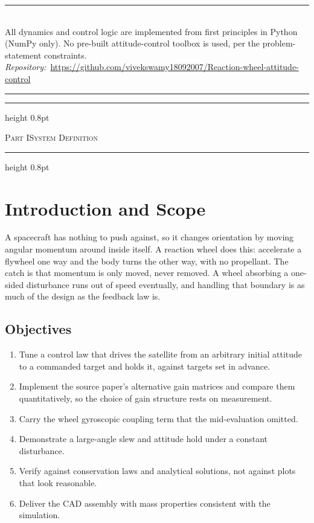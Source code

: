 \documentclass[conference,10pt,a4paper]{IEEEtran}
\newcommand{\reportpart}[2]{%
  \par\medskip\noindent
  \hrule height 0.8pt\vspace{3pt}
  \centerline{\footnotesize\scshape Part #1\quad\textbar\quad #2}
  \vspace{3pt}\hrule height 0.8pt
  \par\medskip}
\begin{document}
\begin{center}
\rule{0.92\columnwidth}{0.4pt}\\[3pt]
{\footnotesize
All dynamics and control logic are implemented from first principles in Python
(NumPy only). No pre-built attitude-control toolbox is used, per the
problem-statement constraints.\\[3pt]
\textit{Repository:}\ \url{https://github.com/vivekswamy18092007/Reaction-wheel-attitude-control}}\\[3pt]
\rule{0.92\columnwidth}{0.4pt}
\end{center}

\vspace{4pt}
{\footnotesize\tableofcontents}
\vspace{4pt}

\reportpart{I}{System Definition}

\section{Introduction and Scope}
\label{sec:intro}

A spacecraft has nothing to push against, so it changes orientation by moving
angular momentum around inside itself. A reaction wheel does this: accelerate
a flywheel one way and the body turns the other way, with no propellant. The
catch is that momentum is only moved, never removed. A wheel absorbing a
one-sided disturbance runs out of speed eventually, and handling that boundary
is as much of the design as the feedback law is.

\subsection{Objectives}

\begin{enumerate}[label=\textbf{O\arabic*.},leftmargin=*,labelsep=0.5em]
\item Tune a control law that drives the satellite from an arbitrary initial
attitude to a commanded target and holds it, against targets set in advance.
\item Implement the source paper's alternative gain matrices and compare them
quantitatively, so the choice of gain structure rests on measurement.
\item Carry the wheel gyroscopic coupling term that the mid-evaluation omitted.
\item Demonstrate a large-angle slew and attitude hold under a constant
disturbance.
\item Verify against conservation laws and analytical solutions, not against
plots that look reasonable.
\item Deliver the CAD assembly with mass properties consistent with the
simulation.
\end{enumerate}
\end{document}
